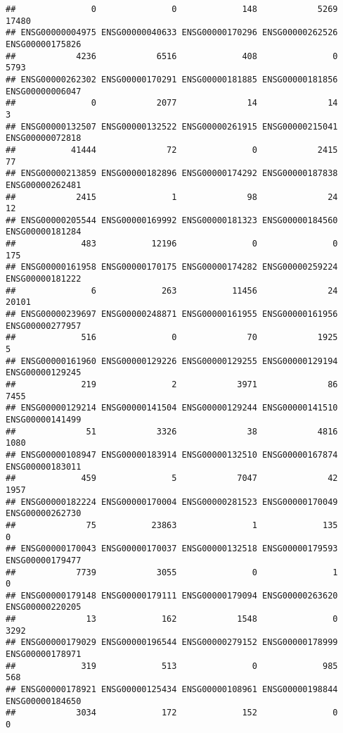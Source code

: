 \documentclass[
]{article}
\begin{document}
\begin{verbatim}
##               0               0             148            5269           17480 
## ENSG00000004975 ENSG00000040633 ENSG00000170296 ENSG00000262526 ENSG00000175826 
##            4236            6516             408               0            5793 
## ENSG00000262302 ENSG00000170291 ENSG00000181885 ENSG00000181856 ENSG00000006047 
##               0            2077              14              14               3 
## ENSG00000132507 ENSG00000132522 ENSG00000261915 ENSG00000215041 ENSG00000072818 
##           41444              72               0            2415              77 
## ENSG00000213859 ENSG00000182896 ENSG00000174292 ENSG00000187838 ENSG00000262481 
##            2415               1              98              24              12 
## ENSG00000205544 ENSG00000169992 ENSG00000181323 ENSG00000184560 ENSG00000181284 
##             483           12196               0               0             175 
## ENSG00000161958 ENSG00000170175 ENSG00000174282 ENSG00000259224 ENSG00000181222 
##               6             263           11456              24           20101 
## ENSG00000239697 ENSG00000248871 ENSG00000161955 ENSG00000161956 ENSG00000277957 
##             516               0              70            1925               5 
## ENSG00000161960 ENSG00000129226 ENSG00000129255 ENSG00000129194 ENSG00000129245 
##             219               2            3971              86            7455 
## ENSG00000129214 ENSG00000141504 ENSG00000129244 ENSG00000141510 ENSG00000141499 
##              51            3326              38            4816            1080 
## ENSG00000108947 ENSG00000183914 ENSG00000132510 ENSG00000167874 ENSG00000183011 
##             459               5            7047              42            1957 
## ENSG00000182224 ENSG00000170004 ENSG00000281523 ENSG00000170049 ENSG00000262730 
##              75           23863               1             135               0 
## ENSG00000170043 ENSG00000170037 ENSG00000132518 ENSG00000179593 ENSG00000179477 
##            7739            3055               0               1               0 
## ENSG00000179148 ENSG00000179111 ENSG00000179094 ENSG00000263620 ENSG00000220205 
##              13             162            1548               0            3292 
## ENSG00000179029 ENSG00000196544 ENSG00000279152 ENSG00000178999 ENSG00000178971 
##             319             513               0             985             568 
## ENSG00000178921 ENSG00000125434 ENSG00000108961 ENSG00000198844 ENSG00000184650 
##            3034             172             152               0               0 

\end{verbatim}
\end{document}
